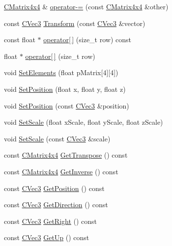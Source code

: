 \begin{DoxyCompactItemize}
\hyperlink{class_slim_1_1_c_matrix4x4}{C\+Matrix4x4} \& \hyperlink{class_slim_1_1_c_matrix4x4_afc033c8833fc14c6548098a9d41ff30c}{operator-\/=} (const \hyperlink{class_slim_1_1_c_matrix4x4}{C\+Matrix4x4} \&other)
\item 
const \hyperlink{class_slim_1_1_c_vec3}{C\+Vec3} \hyperlink{class_slim_1_1_c_matrix4x4_a0b55456e4983fb00133e127c5113c772}{Transform} (const \hyperlink{class_slim_1_1_c_vec3}{C\+Vec3} \&vector)
\item 
const float $\ast$ \hyperlink{class_slim_1_1_c_matrix4x4_a3cb4f46da0cb8fa17fe6cb488fe99468}{operator\mbox{[}$\,$\mbox{]}} (size\+\_\+t row) const 
\item 
float $\ast$ \hyperlink{class_slim_1_1_c_matrix4x4_a417fe6567da3c7ded966b21705a33e2e}{operator\mbox{[}$\,$\mbox{]}} (size\+\_\+t row)
\item 
void \hyperlink{class_slim_1_1_c_matrix4x4_aabcd275ef9454c0e3e29099738bba0e1}{Set\+Elements} (float p\+Matrix\mbox{[}4\mbox{]}\mbox{[}4\mbox{]})
\item 
void \hyperlink{class_slim_1_1_c_matrix4x4_adbc23b4e5c849e8bcc1ec548a66e9608}{Set\+Position} (float x, float y, float z)
\item 
void \hyperlink{class_slim_1_1_c_matrix4x4_a98ecd6f1c87b546d5b7f681d6a44c4fe}{Set\+Position} (const \hyperlink{class_slim_1_1_c_vec3}{C\+Vec3} \&position)
\item 
void \hyperlink{class_slim_1_1_c_matrix4x4_a1f158d7f4fa92644dbdf430cc9ba8467}{Set\+Scale} (float x\+Scale, float y\+Scale, float z\+Scale)
\item 
void \hyperlink{class_slim_1_1_c_matrix4x4_a42e67bd1346774307c27b2487f893d56}{Set\+Scale} (const \hyperlink{class_slim_1_1_c_vec3}{C\+Vec3} \&scale)
\item 
const \hyperlink{class_slim_1_1_c_matrix4x4}{C\+Matrix4x4} \hyperlink{class_slim_1_1_c_matrix4x4_a236b09b2a7e6d8b6ba6535c312d11207}{Get\+Transpose} () const 
\item 
const \hyperlink{class_slim_1_1_c_matrix4x4}{C\+Matrix4x4} \hyperlink{class_slim_1_1_c_matrix4x4_a93e90b7c1a34161f42e986888887a7c6}{Get\+Inverse} () const 
\item 
const \hyperlink{class_slim_1_1_c_vec3}{C\+Vec3} \hyperlink{class_slim_1_1_c_matrix4x4_a5bf8d7c2e53eaf8c9bfcff3ef4eee668}{Get\+Position} () const 
\item 
const \hyperlink{class_slim_1_1_c_vec3}{C\+Vec3} \hyperlink{class_slim_1_1_c_matrix4x4_a4522975e2aaf76a9cf872ab44d2bf9e5}{Get\+Direction} () const 
\item 
const \hyperlink{class_slim_1_1_c_vec3}{C\+Vec3} \hyperlink{class_slim_1_1_c_matrix4x4_a586cc677b3e9fb446b4a9421c2b5f25e}{Get\+Right} () const 
\item 
const \hyperlink{class_slim_1_1_c_vec3}{C\+Vec3} \hyperlink{class_slim_1_1_c_matrix4x4_aa6ee649eca4fdba71059f41e373c8083}{Get\+Up} () const 
\end{DoxyCompactItemize}
